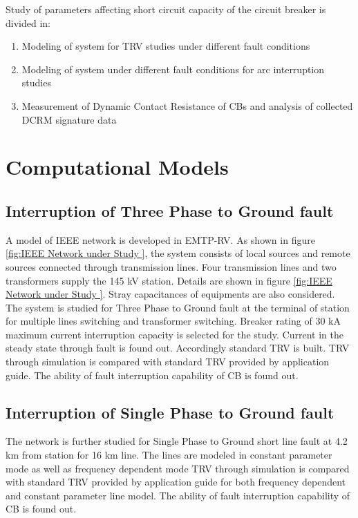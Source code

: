 
Study of parameters affecting short circuit capacity of the circuit breaker is divided in:
\begin{enumerate}
\item Modeling of system for TRV studies under different fault conditions
\item Modeling of system under different fault conditions for arc interruption studies
\item Measurement of Dynamic Contact Resistance of CBs and analysis of collected DCRM signature data
\end{enumerate}

\section{Computational Models}
\subsection{Interruption of Three Phase to Ground fault}
A model of IEEE network is developed in EMTP-RV. As shown in figure \ref{fig:IEEE Network under Study }, the system consists of local sources and remote sources connected through transmission lines. Four transmission lines and two transformers supply the 145 kV station. Details are shown in figure \ref{fig:IEEE Network under Study }. Stray capacitances of equipments are also considered. The system is studied for Three Phase to Ground fault at the terminal of station for multiple lines switching and transformer switching. Breaker rating of 30 kA maximum current interruption capacity is selected for the study. Current in the steady state through fault is found out. Accordingly standard TRV is built. TRV through simulation is compared with standard TRV provided by application guide. The ability of fault interruption capability of CB is found out.

\subsection{Interruption of Single  Phase to Ground fault}
The network is further studied for Single Phase to Ground short line fault at 4.2 km from station for 16 km line. The lines are modeled in constant parameter mode as well as frequency dependent mode TRV through simulation is compared with standard TRV provided by application guide for both frequency dependent and constant parameter line model. The ability of fault interruption capability of CB is found out.

